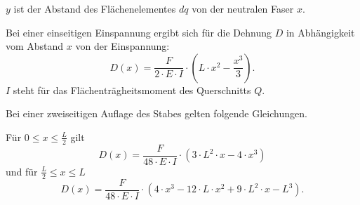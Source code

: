 $y$ ist der Abstand des Flächenelementes $dq$ von der neutralen Faser $x$.

Bei einer einseitigen Einspannung ergibt sich für die Dehnung $D$ in Abhängigkeit vom Abstand $x$ von der Einspannung:
\begin{equation}\label{eqn:einseitig}
    D(x) = \frac{F}{2 \cdot E \cdot I} \cdot (L \cdot x^2 - \frac{x^3}{3}) .
\end{equation}
$I$ steht für das Flächenträgheitsmoment des Querschnitts $Q$.

Bei einer zweiseitigen Auflage des Stabes gelten folgende Gleichungen.

Für $0 \leq x \leq \frac{L}{2}$ gilt 
\begin{equation}\label{eqn:beidseitig1}
    D(x) = \frac{F}{48 \cdot E \cdot I} \cdot (3 \cdot L^2 \cdot x - 4 \cdot x^3)
\end{equation}
und für $\frac{L}{2} \leq x \leq L$
\begin{equation}\label{eqn:beidseitig2}
    D(x) = \frac{F}{48 \cdot E \cdot I} \cdot (4 \cdot x^3 - 12 \cdot L \cdot x^2 + 9 \cdot L^2 \cdot x - L^3) .
\end{equation}
